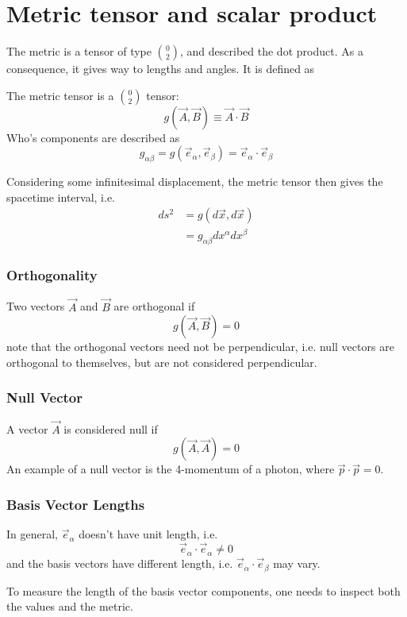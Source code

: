 \section{Metric tensor and scalar product}
The metric is a tensor of type $\binom{0}{2}$, and described the dot product. As a consequence, it gives way to lengths and angles. It is defined as
\begin{definition}
The metric tensor is a $\binom{0}{2}$ tensor:
    $$ g(\vec{A}, \vec{B}) \equiv \vec{A}\cdot\vec{B} $$
Who's components are described as 
$$ g_{\alpha \beta} = g(\vec{e}_\alpha, \vec{e}_\beta) = \vec{e}_\alpha \cdot \vec{e}_\beta $$
\end{definition}
Considering some infinitesimal displacement, the metric tensor then gives the spacetime interval, i.e.
\begin{align*}
    ds^2 & = g(d\vec{x}, d\vec{x}) \\ & = g_{\alpha \beta} dx^\alpha dx^\beta
\end{align*}
\subsubsection{Orthogonality}
Two vectors $\vec{A}$ and $\vec{B}$ are orthogonal if 
$$ g(\vec{A}, \vec{B}) = 0 $$
note that the orthogonal vectors need not be perpendicular, i.e. null vectors are orthogonal to themselves, but are not considered perpendicular.
\subsubsection{Null Vector}
A vector $\vec{A}$ is considered null if
$$ g(\vec{A}, \vec{A}) = 0 $$
An example of a null vector is the 4-momentum of a photon, where $\vec{p}\cdot \vec{p} = 0$.
\subsubsection{Basis Vector Lengths}
In general, $\vec{e}_\alpha$ doesn't have unit length, i.e.
$$ \vec{e}_\alpha \cdot \vec{e}_\alpha \neq 0 $$
and the basis vectors have different length, i.e. $\vec{e}_\alpha \cdot \vec{e}_\beta$ may vary. \par 
To measure the length of the basis vector components, one needs to inspect both the values and the metric.

